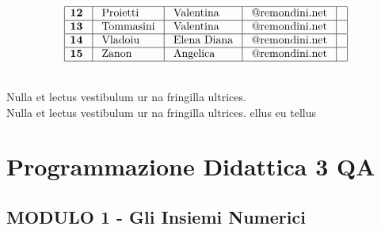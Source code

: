 \documentclass[10pt, a4paper twoside, notitlepage, notoc, justified]{tufte-handout}
\begin{document}
$$\begin{array}{|l|l|l|l|l|}
\hline \text {\bf 12 } & \text { Proietti } & \text { Valentina } & \text { @remondini.net } & \\
\hline \text {\bf 13 } & \text { Tommasini } & \text { Valentina } & \text { @remondini.net } & \\
\hline \text {\bf 14 } & \text { Vladoiu } & \text { Elena Diana } & \text { @remondini.net } & \\
\hline \text {\bf 15 } & \text { Zanon } & \text { Angelica } & \text { @remondini.net } & \\
\hline
\end{array}
$$

\\ Nulla et lectus vestibulum ur na fringilla ultrices. 
\\ Nulla et lectus vestibulum ur na fringilla ultrices. ellus eu tellus

\newpage
\section{Programmazione Didattica 3 QA}
\subsection{\small \bf MODULO 1 - Gli Insiemi Numerici}
\end{document}
